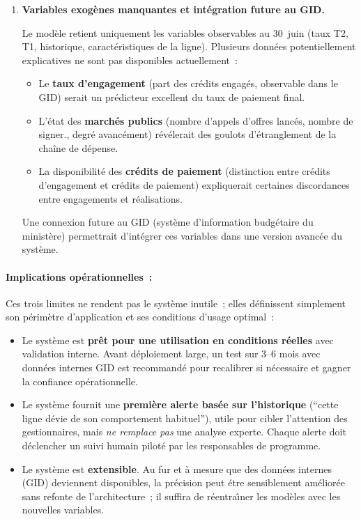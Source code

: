 \begin{enumerate}
    \item \textbf{Variables exog\`enes manquantes et int\'egration future au GID.}
    
    Le mod\`ele retient uniquement les variables observables au 30~juin (taux T2, T1,
    historique, caract\'eristiques de la ligne). Plusieurs donn\'ees potentiellement
    explicatives ne sont pas disponibles actuellement~:
    \begin{itemize}
        \item Le \textbf{taux d'engagement} (part des cr\'edits engag\'es, observable
        dans le GID) serait un pr\'edicteur excellent du taux de paiement final.
        \item L'\'etat des \textbf{march\'es publics} (nombre d'appels d'offres lanc\'es,
        nombre de signer., degr\'e avanc\'ement) r\'ev\'elerait des goulots d'\'etranglement
        de la chaîne de d\'epense.
        \item La disponibilit\'e des \textbf{cr\'edits de paiement} (distinction entre
        cr\'edits d'engagement et cr\'edits de paiement) expliquerait certaines
        discordances entre engagements et r\'ealisations.
    \end{itemize}
    Une connexion future au GID (syst\`eme d'information budg\'etaire du minist\`ere)
    permettrait d'int\'egrer ces variables dans une version avanc\'ee du syst\`eme.

\end{enumerate}

\paragraph{Implications op\'erationnelles~:}

Ces trois limites ne rendent pas le syst\`eme inutile~; elles d\'efinissent simplement
son p\'erim\`etre d'application et ses conditions d'usage optimal~:

\begin{itemize}
    \item Le syst\`eme est \textbf{pr\^et pour une utilisation en conditions r\'eelles}
    avec validation interne. Avant d\'eploiement large, un test sur 3--6 mois avec
    donn\'ees internes GID est recommand\'e pour recalibrer si n\'ecessaire et gagner
    la confiance op\'erationnelle.

    \item Le syst\`eme fournit une \textbf{premi\`ere alerte bas\'ee sur l'historique}
    (``cette ligne d\'evie de son comportement habituel''), utile pour cibler l'attention
    des gestionnaires, mais \textit{ne remplace pas} une analyse experte. Chaque alerte
    doit d\'eclencher un suivi humain pilot\'e par les responsables de programme.

    \item Le syst\`eme est \textbf{extensible}. Au fur et \`a mesure que des donn\'ees
    internes (GID) deviennent disponibles, la pr\'ecision peut \'etre sensiblement
    am\'elior\'ee sans refonte de l'architecture~; il suffira de r\'eentra\^{\i}ner les
    mod\`eles avec les nouvelles variables.
\end{itemize}

